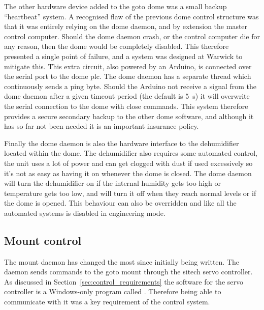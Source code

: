 \begin{colsection}
\begin{colsection}
The other hardware device added to the \gls{goto} dome was a small backup ``heartbeat'' system. A recognised flaw of the previous dome control structure was that it was entirely relying on the dome daemon, and by extension the master control computer. Should the dome daemon crash, or the control computer die for any reason, then the dome would be completely disabled. This therefore presented a single point of failure, and a system was designed at Warwick to mitigate this. This extra circuit, also powered by an Arduino, is connected over the serial port to the dome \gls{plc}. The dome daemon has a separate thread which continuously sends a ping byte. Should the Arduino not receive a signal from the dome daemon after a given timeout period (the default is \SI{5}{\second}) it will overwrite the serial connection to the dome with close commands. This system therefore provides a secure secondary backup to the other dome software, and although it has so far not been needed it is an important insurance policy.


Finally the dome daemon is also the hardware interface to the dehumidifier located within the dome. The dehumidifier also requires some automated control, the unit uses a lot of power and can get clogged with dust if used excessively so it's not as easy as having it on whenever the dome is closed. The dome daemon will turn the dehumidifier on if the internal humidity gets too high or temperature gets too low, and will turn it off when they reach normal levels or if the dome is opened. This behaviour can also be overridden and like all the automated systems is disabled in engineering mode.

\end{colsection}


\subsection{Mount control}
\label{sec:mount}
\begin{colsection}

The mount daemon has changed the most since initially being written. The daemon sends commands to the \gls{goto} mount through the \gls{sitech} servo controller. As discussed in Section~\ref{sec:control_requirements} the software for the servo controller is a Windows-only program called . Therefore being able to communicate with it was a key requirement of the control system.


\end{colsection}
\end{colsection}
